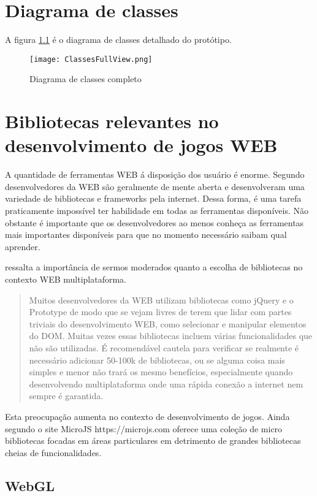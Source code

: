 \chapter{Diagrama de classes}

A figura \ref{fig:fullDiagram} é o diagrama de classes detalhado do protótipo.
\begin{figure}
    \centering
    \texttt{[image: ClassesFullView.png]}
	\caption{Diagrama de classes completo}
    \label{fig:fullDiagram}
\end{figure}


\chapter{Bibliotecas relevantes no desenvolvimento de jogos WEB}

A quantidade de ferramentas WEB á disposição dos usuário é
enorme. Segundo \autocite{html5mostwanted} desenvolvedores da WEB são
geralmente de mente aberta e desenvolveram uma variedade de bibliotecas e frameworks pela internet. Dessa forma, é uma tarefa praticamente
impossível ter habilidade em todas as ferramentas disponíveis.
Não obstante é importante que os desenvolvedores ao menos conheça
as ferramentas mais importantes disponíveis para que no momento
necessário saibam qual aprender.

\cite{creatingFun} ressalta a importância de sermos moderados
quanto a escolha de bibliotecas no contexto WEB multiplataforma.
\begin{quote}
Muitos desenvolvedores da WEB utilizam bibliotecas como jQuery e o
Prototype de modo que se vejam livres de terem que lidar com
partes triviais do desenvolvimento WEB, como selecionar e
manipular elementos do DOM. Muitas vezes essas bibliotecas incluem
várias funcionalidades que não são utilizadas. É recomendável
cautela para verificar se realmente é necessário adicionar 50-100k
de bibliotecas, ou se alguma coisa mais simples e menor não trará
os mesmo benefícios, especialmente quando desenvolvendo
multiplataforma onde uma rápida conexão a internet nem sempre é
garantida.
\end{quote}

Esta preocupação aumenta no contexto de desenvolvimento de jogos.
Ainda segundo \cite{creatingFun} o site MicroJS https://microjs.com
oferece uma coleção de micro bibliotecas focadas em áreas
particulares em detrimento de grandes bibliotecas cheias de
funcionalidades.

\section{WebGL}

